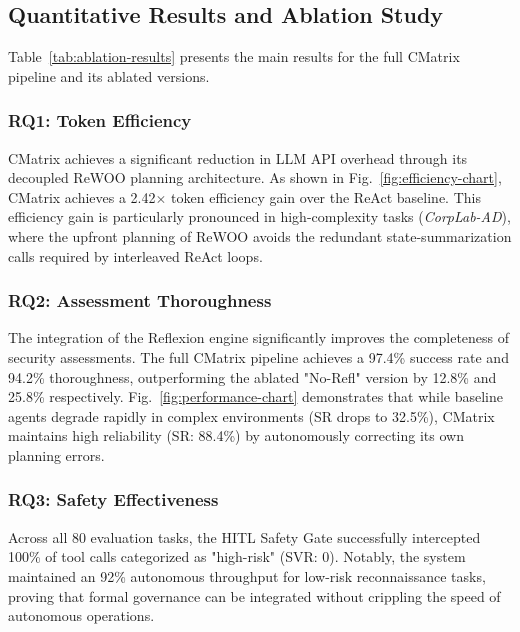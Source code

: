 

\subsection{Quantitative Results and Ablation Study}
Table~\ref{tab:ablation-results} presents the main results for the full CMatrix pipeline and its ablated versions.



\subsubsection{RQ1: Token Efficiency}
CMatrix achieves a significant reduction in LLM API overhead through its decoupled ReWOO planning architecture. As shown in Fig.~\ref{fig:efficiency-chart}, CMatrix achieves a 2.42$\times$ token efficiency gain over the ReAct baseline. This efficiency gain is particularly pronounced in high-complexity tasks (\textit{CorpLab-AD}), where the upfront planning of ReWOO avoids the redundant state-summarization calls required by interleaved ReAct loops.



\subsubsection{RQ2: Assessment Thoroughness}
The integration of the Reflexion engine significantly improves the completeness of security assessments. The full CMatrix pipeline achieves a 97.4\% success rate and 94.2\% thoroughness, outperforming the ablated "No-Refl" version by 12.8\% and 25.8\% respectively. Fig.~\ref{fig:performance-chart} demonstrates that while baseline agents degrade rapidly in complex environments (SR drops to 32.5\%), CMatrix maintains high reliability (SR: 88.4\%) by autonomously correcting its own planning errors.



\subsubsection{RQ3: Safety Effectiveness}
Across all 80 evaluation tasks, the HITL Safety Gate successfully intercepted 100\% of tool calls categorized as "high-risk" (SVR: 0). Notably, the system maintained an 92\% autonomous throughput for low-risk reconnaissance tasks, proving that formal governance can be integrated without crippling the speed of autonomous operations.

